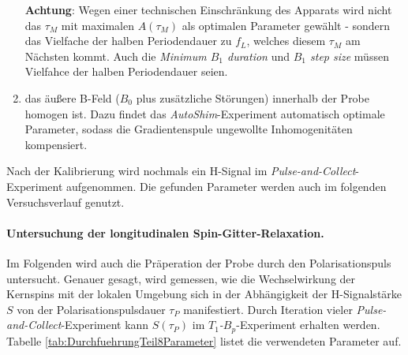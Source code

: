 \documentclass[../main.tex]{subfiles}
\begin{document}
\begin{enumerate}
            \textbf{Achtung}: Wegen einer technischen Einschränkung des Apparats wird nicht das $\tau_M$ mit maximalen $A(\tau_M)$ als optimalen Parameter gewählt - sondern das Vielfache der halben Periodendauer zu $f_L$, welches diesem $\tau_M$ am Nächsten kommt. Auch die \textit{Minimum $B_1$ duration} und \textit{$B_1$ step size} müssen Vielfahce der halben Periodendauer seien. 
            
            \item das äußere B-Feld ($B_0$ plus zusätzliche Störungen) innerhalb der Probe homogen ist. Dazu findet das \textit{AutoShim}-Experiment automatisch optimale Parameter, sodass die Gradientenspule ungewollte Inhomogenitäten kompensiert.
        \end{enumerate}

        Nach der Kalibrierung wird nochmals ein H-Signal im \textit{Pulse-and-Collect}-Experiment aufgenommen. Die gefunden Parameter werden auch im folgenden Versuchsverlauf genutzt.
    
    \paragraph{Untersuchung der longitudinalen Spin-Gitter-Relaxation.}
        Im Folgenden wird auch die Präperation der Probe durch den Polarisationspuls untersucht. Genauer gesagt, wird gemessen, wie die Wechselwirkung der Kernspins mit der lokalen Umgebung sich in der Abhängigkeit der H-Signalstärke $S$ von der Polarisationspulsdauer $\tau_P$ manifestiert. Durch Iteration vieler \textit{Pulse-and-Collect}-Experiment kann $S(\tau_P)$ im \textit{$T_1$-$B_p$}-Experiment erhalten werden. Tabelle \ref{tab:DurchfuehrungTeil8Parameter} listet die verwendeten Parameter auf.
\end{document}
